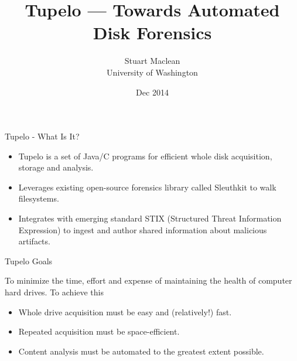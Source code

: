 \documentclass{beamer}
\title[Tupelo] %
{Tupelo --- Towards Automated Disk Forensics}
\author[] %
{Stuart Maclean \\
University of Washington}
\date[] %
{Dec 2014}
\begin{document}

\begin{frame}
  \titlepage
\end{frame}




\begin{frame}{Tupelo - What Is It?}

\begin{itemize}
\item Tupelo is a set of Java/C programs for efficient whole disk
  acquisition, storage and analysis.

\item Leverages existing open-source forensics library called
  Sleuthkit to walk filesystems.

\item Integrates with emerging standard STIX (Structured
  Threat Information Expression) to ingest and
  author shared information about malicious artifacts.

\end{itemize}

\end{frame}



\begin{frame}{Tupelo Goals}

To minimize the time, effort and expense of maintaining the health of
computer hard drives.  To achieve this

\begin{itemize}

\item Whole drive acquisition must be easy and (relatively!) fast.

\item Repeated acquisition must be space-efficient.

\item Content analysis must be automated to the greatest
  extent possible.

\end{itemize}

\end{frame}
\end{document}

